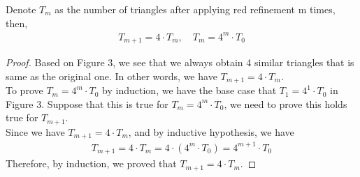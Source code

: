     \begin{lemma}
    Denote $T_{m}$ as the number of triangles after applying red refinement m times, then,
    \begin{align*}
    T_{m+1} = 4 \cdot T_{m}, \quad T_{m} = 4^m \cdot T_0
    \end{align*}
    \end{lemma}
    \begin{proof}
    Based on Figure 3, we see that we always obtain 4 similar triangles that is same as the original one. In other words, we have $T_{m+1} = 4 \cdot T_{m}$.\\
    To prove $T_{m} = 4^m \cdot T_0$ by induction, we have the base case that $T_1 = 4^1 \cdot T_0$ in Figure 3. Suppose that this is true for $T_{m} = 4^m \cdot T_0$, we need to prove this holds true for $T_{m+1}$.\\
    Since we have $T_{m+1} = 4 \cdot T_{m}$, and by inductive hypothesis, we have
    \begin{align*}
    T_{m+1} = 4 \cdot T_{m} = 4 \cdot (4^m\cdot T_0) = 4^{m+1}\cdot T_0
    \end{align*}
    Therefore, by induction, we proved that $T_{m+1} = 4 \cdot T_{m}$.
    \end{proof}

